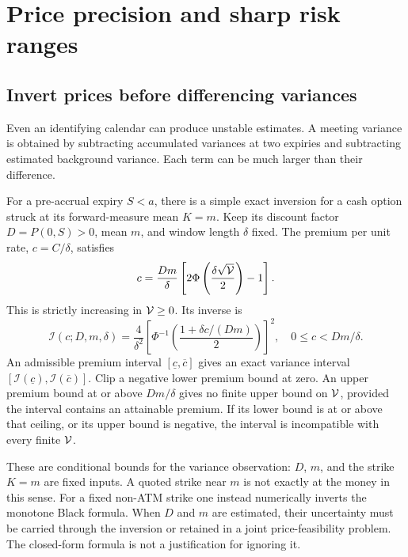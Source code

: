 \section{Price precision and sharp risk ranges}\label{sec:precision}
\subsection{Invert prices before differencing variances}
Even an identifying calendar can produce unstable estimates. A meeting variance is obtained by subtracting accumulated variances at two expiries and subtracting estimated background variance. Each term can be much larger than their difference.

For a pre-accrual expiry $S<a$, there is a simple exact inversion for a cash option struck at its forward-measure mean $K=m$. Keep its discount factor $D=P(0,S)>0$, mean $m$, and window length $\delta$ fixed. The premium per unit rate, $c=C/\delta$, satisfies
\begin{equation}\label{eq:atm}
c=\frac{Dm}{\delta}\left[2\Phi\left(\frac{\delta\sqrt{\mathcal V}}{2}\right)-1\right].
\end{equation}
This is strictly increasing in $\mathcal V\geq0$. Its inverse is
\begin{equation}\label{eq:inverse}
\mathcal I(c;D,m,\delta)=\frac4{\delta^2}
 \left[\Phi^{-1}\left(\frac{1+\delta c/(Dm)}2\right)\right]^2,
 \quad 0\leq c<Dm/\delta.
\end{equation}
An admissible premium interval $[\underline c,\overline c]$ gives an exact variance interval $[\mathcal I(\underline c),\mathcal I(\overline c)]$. Clip a negative lower premium bound at zero. An upper premium bound at or above $Dm/\delta$ gives no finite upper bound on $\mathcal V$, provided the interval contains an attainable premium. If its lower bound is at or above that ceiling, or its upper bound is negative, the interval is incompatible with every finite $\mathcal V$.

These are conditional bounds for the variance observation: $D$, $m$, and the strike $K=m$ are fixed inputs. A quoted strike near $m$ is not exactly at the money in this sense. For a fixed non-ATM strike one instead numerically inverts the monotone Black formula. When $D$ and $m$ are estimated, their uncertainty must be carried through the inversion or retained in a joint price-feasibility problem. The closed-form formula is not a justification for ignoring it.

